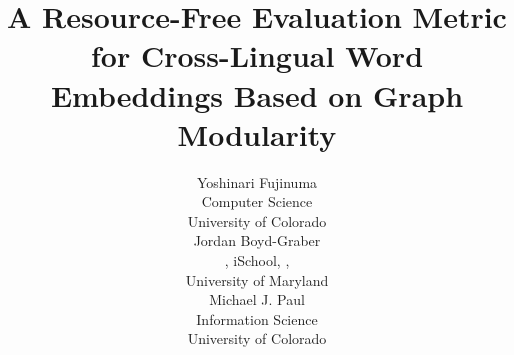 \documentclass[11pt,a4paper]{article}
\title{A Resource-Free Evaluation Metric for Cross-Lingual Word Embeddings Based on Graph Modularity}
\author{Yoshinari Fujinuma \\
        Computer Science \\
        University of Colorado \\
        \email{fujinumay@gmail.com}
        \And
        Jordan Boyd-Graber \\
        \abr{cs}, iSchool, \abr{umiacs}, \abr{lsc} \\
        University of Maryland \\
        \email{jbg@umiacs.umd.edu}
        \And
        Michael J. Paul\\
        Information Science\\
        University of Colorado \\
        \email{mpaul@colorado.edu}
        }
\date{}
\newcommand{\latexfile}[1]{}
\begin{document}
\maketitle
\begin{abstract}
\latexfile{00-abstract}
\end{abstract}

\latexfile{10-introduction}
\latexfile{20-background}
\latexfile{30-modularity}
\latexfile{40-experiment}
\latexfile{50-discussion}
\latexfile{70-conclusion}
\latexfile{acknowledgements}




\end{document}
